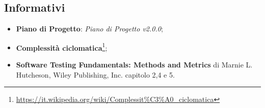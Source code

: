 \subsection{Informativi}\label{rfinf}
\begin{itemize}
	\item \textbf{Piano di Progetto}: \textit{Piano di Progetto v2.0.0};
	\item \textbf{Complessità ciclomatica}\footnote{\url{https://it.wikipedia.org/wiki/Complessit\%C3\%A0_ciclomatica}};
	\item \textbf{Software Testing Fundamentals: Methods and Metrics} di Marnie L. Hutcheson, Wiley Publishing, Inc. capitolo 2,4 e 5.
\end{itemize}
